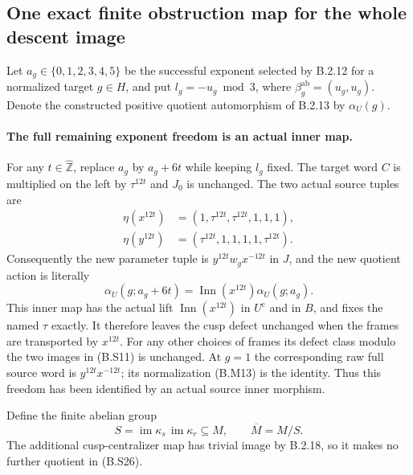 \subsection{One exact finite obstruction map for the whole descent image}

Let $a_g\in\{0,1,2,3,4,5\}$ be the successful exponent
selected by B.2.12 for a normalized target $g\in H$, and
put $l_g=-u_g\bmod3$, where
$\beta_g^{\mathrm{ab}}=(u_g,u_g)$.  Denote the constructed
positive quotient automorphism of B.2.13 by $\alpha_U(g)$.

\paragraph{The full remaining exponent freedom is an actual inner map.}
For any $t\in\widehat{\mathbb Z}$, replace $a_g$ by
$a_g+6t$ while keeping $l_g$ fixed.  The target word $C$
is multiplied on the left by $\tau^{12t}$ and $J_0$
is unchanged.  The two actual source tuples are
\[
\begin{aligned}
 \eta(x^{12t})&=(1,\tau^{12t},\tau^{12t},1,1,1),\\
 \eta(y^{12t})&=(\tau^{12t},1,1,1,1,\tau^{12t}).
\end{aligned}                                                   \tag{B.S24}
\]
Consequently the new parameter tuple is
$y^{12t}w_gx^{-12t}$ in $J$, and the new quotient action
is literally
\[
 \alpha_U(g;a_g+6t)=
               \operatorname{Inn}(x^{12t})\alpha_U(g;a_g).
                                                                  \tag{B.S25}
\]
This inner map has the actual lift
$\operatorname{Inn}(x^{12t})$ in $U^{\mathrm c}$ and in
$B$, and fixes the named $\tau$ exactly.  It therefore
leaves the cusp defect unchanged when the frames are
transported by $x^{12t}$.  For any other choices of frames
its defect class modulo the two images in (B.S11) is
unchanged.  At $g=1$ the corresponding raw full source
word is $y^{12t}x^{-12t}$; its normalization (B.M13) is
the identity.  Thus this freedom has been identified
by an actual source inner morphism.

Define the finite abelian group
\[
 S=\operatorname{im}\kappa_s\,
                    \operatorname{im}\kappa_r\subseteq M,
                 \qquad \overline M=M/S.                      \tag{B.S26}
\]
The additional cusp-centralizer map has trivial image
by B.2.18, so it makes no further quotient in (B.S26).

